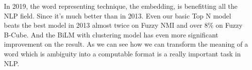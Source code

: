 In 2019, the word representing technique, the embedding, is benefitting all the NLP field.
Since it's much better than in 2013.
Even our basic Top N model beats the best model in 2013 almost twice on Fuzzy NMI and over 8\% on Fuzzy B-Cube.
And the BiLM with clustering model has even more significant improvement on the result.
As we can see how we can transform the meaning of a word which is ambiguity into a computable format is a really important task in NLP.